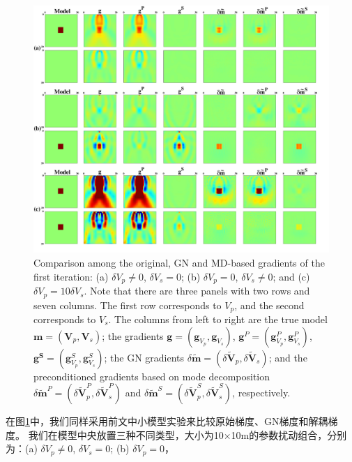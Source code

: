 \begin{figure}[!htb]
    \begin{center}
        \includegraphics[width=14cm]{Figure/chapter02/Hessiantest/Fig/newepsall.pdf}
        \caption{
    Comparison among the original, GN and MD-based gradients
        of the first iteration:
    (a) $\delta V_p \neq 0$, $\delta V_s=0$; (b) $\delta V_p=0$, $\delta V_s\neq0$; and (c)
    $\delta V_p=10 \delta V_s$.
        Note that there are three panels with two rows and seven columns.
        The first row corresponds to $V_p$, and the second
                corresponds to $V_s$.
    The columns from left to right are the true model $\mathbf{m}=(\mathbf{V}_p,
    \mathbf{V}_s)$;
    the gradients $\mathbf{g}=(\mathbf{g}_{V_p},\mathbf{g}_{V_s})$,
    $\mathbf{g}^P=(\mathbf{g}^P_{V_p},\mathbf{g}^P_{V_s})$,
    $\mathbf{g^S}=(\mathbf{g}^S_{V_p},\mathbf{g}^S_{V_s})$;
    the GN gradients $\delta
    \mathbf{\tilde{m}}=(\delta\mathbf{\tilde{V}}_p,\delta\mathbf{\tilde{V}}_s)$;
        and the preconditioned gradients based on mode decomposition $\delta
        \mathbf{\tilde{m}}^P=(\delta\mathbf{\tilde{V}}^P_p,\delta\mathbf{\tilde{V}}^P_s)$
        and $\delta
        \mathbf{\tilde{m}}^S=(\delta\mathbf{\tilde{V}}^S_p,\delta\mathbf{\tilde{V}}^S_s)$, respectively.
    }
    \label{fig:all}
    \end{center}
\end{figure}
在图\ref{fig:all}中，我们同样采用前文中小模型实验来比较原始梯度、GN梯度和解耦梯度。
我们在模型中央放置三种不同类型，大小为10$\times$10m的参数扰动组合，分别为：(a) $\delta V_p \neq 0$, $\delta V_s = 0$; (b) $\delta V_p = 0$，

